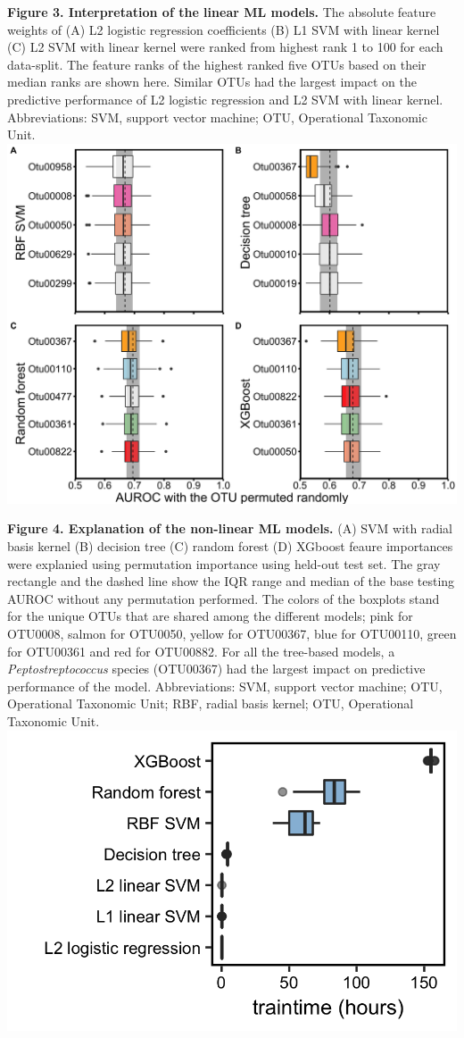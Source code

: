 \documentclass[11pt,]{article}
\begin{document}
\textbf{Figure 3. Interpretation of the linear ML models.} The absolute
feature weights of (A) L2 logistic regression coefficients (B) L1 SVM
with linear kernel (C) L2 SVM with linear kernel were ranked from
highest rank 1 to 100 for each data-split. The feature ranks of the
highest ranked five OTUs based on their median ranks are shown here.
Similar OTUs had the largest impact on the predictive performance of L2
logistic regression and L2 SVM with linear kernel. Abbreviations: SVM,
support vector machine; OTU, Operational Taxonomic Unit. \newpage
\includegraphics{Figure_4.png}

\textbf{Figure 4. Explanation of the non-linear ML models.} (A) SVM with
radial basis kernel (B) decision tree (C) random forest (D) XGboost
feaure importances were explanied using permutation importance using
held-out test set. The gray rectangle and the dashed line show the IQR
range and median of the base testing AUROC without any permutation
performed. The colors of the boxplots stand for the unique OTUs that are
shared among the different models; pink for OTU0008, salmon for OTU0050,
yellow for OTU00367, blue for OTU00110, green for OTU00361 and red for
OTU00882. For all the tree-based models, a \emph{Peptostreptococcus}
species (OTU00367) had the largest impact on predictive performance of
the model. Abbreviations: SVM, support vector machine; OTU, Operational
Taxonomic Unit; RBF, radial basis kernel; OTU, Operational Taxonomic
Unit. \newpage
\includegraphics{Figure_5.png}
\end{document}
